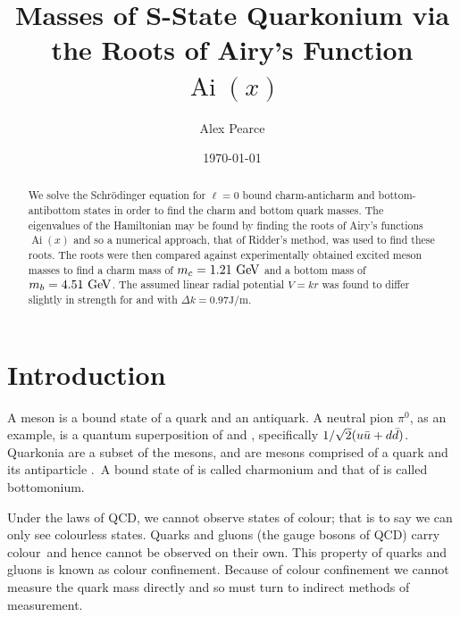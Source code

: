 \documentclass[]{article}
\newcommand{\Ai}[1]{\ensuremath{\operatorname{Ai}({#1})}}
\begin{document}
\title{Masses of S-State Quarkonium via the Roots of Airy's Function $\Ai{x}$}
\author{Alex Pearce}
\date{\today}
\maketitle


\begin{abstract}
We solve the Schr\"{o}dinger equation for $\ell = 0$ bound charm-anticharm \ccbar and bottom-antibottom \bbbar states in order to find the charm and bottom quark masses. The eigenvalues of the Hamiltonian may be found by finding the roots of Airy's functions $\Ai{x}$ and so a numerical approach, that of Ridder's method, was used to find these roots. The roots were then compared against experimentally obtained excited meson masses to find a charm mass of $m_{c} = 1.21\GeV$ and a bottom mass of $m_{b} = 4.51\GeV$. The assumed linear radial potential $V = kr$ was found to differ slightly in strength for \ccbar and \bbbar with $\Delta k = 0.97\si{\joule\per\metre}$.
\end{abstract}


\section{Introduction}\label{sec:intro}

A meson is a bound state of a quark and an antiquark. A neutral pion $\pi^{0}$, as an example, is a quantum superposition of \uubar and \ddbar, specifically $1/\sqrt{2}(u\bar{u} + d\bar{d})$. Quarkonia are a subset of the mesons, and are mesons comprised of a quark and its antiparticle \qqbar.\footnotemark\ A bound state of \ccbar is called charmonium and that of \bbbar is called bottomonium.


Under the laws of QCD, we cannot observe states of colour; that is to say we can only see colourless states. Quarks and gluons (the gauge bosons of QCD) carry colour\footnotemark\ and hence cannot be observed on their own. This property of quarks and gluons is known as colour confinement. Because of colour confinement we cannot measure the quark mass directly and so must turn to indirect methods of measurement.
\end{document}
